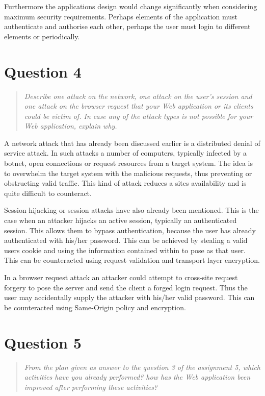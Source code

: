 \documentclass[10pt,a4paper]{report}
\begin{document}
Furthermore the applications design would change significantly when considering maximum security requirements. Perhaps elements of the application must authenticate and authorise each other, perhaps the user must login to different elements or periodically.

\section{Question 4}
\begin{quote}
\textit{Describe one attack on the network, one attack on the user's session and one attack on the browser request that your Web application or its clients could be victim of. In case any of the attack types is not possible for your Web application, explain why.}
\end{quote}

A network attack that has already been discussed earlier is a distributed denial of service attack. In such attacks a number of computers, typically infected by a botnet, open connections or request resources from a target system. The idea is to overwhelm the target system with the malicious requests, thus preventing or obstructing valid traffic. This kind of attack reduces a sites availability and is quite difficult to counteract.

Session hijacking or session attacks have also already been mentioned. This is the case when an attacker hijacks an active session, typically an authenticated session. This allows them to bypass authentication, because the user has already authenticated with his/her password. This can be achieved by stealing a valid users cookie and using the information contained within to pose as that user. This can be counteracted using request validation and transport layer encryption.

In a browser request attack an attacker could attempt to cross-site request forgery to pose the server and send the client a forged login request. Thus the user may accidentally supply the attacker with his/her valid password. This can be counteracted  using Same-Origin policy and encryption.

\section{Question 5}
\begin{quote}
\textit{From the plan given as answer to the question 3 of the assignment 5, which activities have you already performed? how has the Web application been improved after performing these activities?}
\end{quote}
\end{document}
